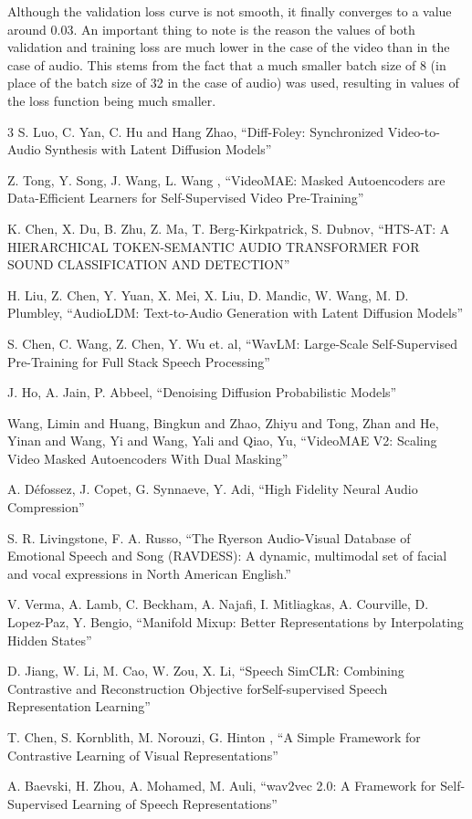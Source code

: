 \documentclass[12pt]{article}
\begin{document}
Although the validation loss curve is not smooth, it finally converges to a value around 0.03. An important thing to note is the reason the values of both validation and training loss are much lower in the case of the video than in the case of audio. This stems from the fact that a much smaller batch size of 8 (in place of the batch size of 32 in the case of audio) was used, resulting in values of the loss function being much smaller.
\begin{thebibliography}{3}
S. Luo, C. Yan, C. Hu and Hang Zhao,
``Diff-Foley: Synchronized Video-to-Audio Synthesis with Latent Diffusion Models''

Z. Tong, Y. Song, J. Wang, L. Wang ,
``VideoMAE: Masked Autoencoders are Data-Efficient Learners for Self-Supervised Video Pre-Training''

K. Chen, X. Du, B. Zhu, Z. Ma, T. Berg-Kirkpatrick, S. Dubnov,
``HTS-AT: A HIERARCHICAL TOKEN-SEMANTIC AUDIO TRANSFORMER FOR SOUND CLASSIFICATION AND DETECTION''

H. Liu, Z. Chen, Y. Yuan, X. Mei, X. Liu, D. Mandic, W. Wang, M. D. Plumbley,
``AudioLDM: Text-to-Audio Generation with Latent Diffusion Models''

S. Chen, C. Wang, Z. Chen, Y. Wu et. al, 
``WavLM: Large-Scale Self-Supervised Pre-Training for Full Stack Speech Processing''

J. Ho, A. Jain, P. Abbeel,
``Denoising Diffusion Probabilistic Models''

Wang, Limin and Huang, Bingkun and Zhao, Zhiyu and Tong, Zhan and He, Yinan and Wang, Yi and Wang, Yali and Qiao, Yu,
``VideoMAE V2: Scaling Video Masked Autoencoders With Dual Masking''

A. Défossez, J. Copet, G. Synnaeve, Y. Adi,
``High Fidelity Neural Audio Compression''

S. R. Livingstone, F. A. Russo,
``The Ryerson Audio-Visual Database of Emotional Speech and Song (RAVDESS): A dynamic, multimodal set of facial and vocal expressions in North American English.''

V. Verma, A. Lamb, C. Beckham, A. Najafi, I. Mitliagkas, A. Courville, D. Lopez-Paz, Y. Bengio,
``Manifold Mixup: Better Representations by Interpolating Hidden States''

D. Jiang, W. Li, M. Cao, W. Zou, X. Li,
``Speech SimCLR: Combining Contrastive and Reconstruction Objective forSelf-supervised Speech Representation Learning''

T. Chen, S. Kornblith, M. Norouzi, G. Hinton ,
``A Simple Framework for Contrastive Learning of Visual Representations''

A. Baevski, H. Zhou, A. Mohamed, M. Auli,
``wav2vec 2.0: A Framework for Self-Supervised Learning of Speech Representations''
\end{thebibliography}
\end{document}
